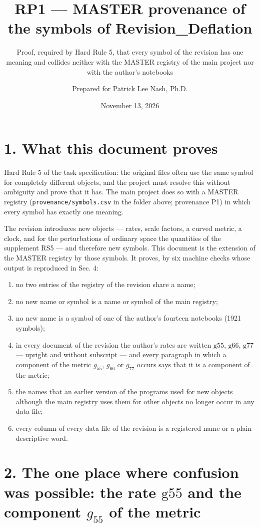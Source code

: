 \documentclass[
  10pt,
]{article}
\title{RP1 --- MASTER provenance of the symbols of Revision\_Deflation}
\subtitle{Proof, required by Hard Rule 5, that every symbol of the
revision has one meaning and collides neither with the MASTER registry
of the main project nor with the author's notebooks}
\author{Prepared for Patrick Lee Nash, Ph.D.}
\date{November 13, 2026}
\providecommand{\tightlist}{%
  \setlength{\itemsep}{0pt}\setlength{\parskip}{0pt}}
\begin{document}
\maketitle

\hypertarget{what-this-document-proves}{%
\section{1. What this document proves}\label{what-this-document-proves}}

Hard Rule 5 of the task specification: the original files often use the
same symbol for completely different objects, and the project must
resolve this without ambiguity and prove that it has. The main project
does so with a MASTER registry (\texttt{provenance/symbols.csv} in the
folder above; provenance P1) in which every symbol has exactly one
meaning.

The revision introduces new objects --- rates, scale factors, a curved
metric, a clock, and for the perturbations of ordinary space the
quantities of the supplement RS5 --- and therefore new symbols. This
document is the extension of the MASTER registry by those symbols. It
proves, by six machine checks whose output is reproduced in Sec. 4:

\begin{enumerate}
\def\labelenumi{\arabic{enumi}.}
\tightlist
\item
  no two entries of the registry of the revision share a name;
\item
  no new name or symbol is a name or symbol of the main registry;
\item
  no new name is a symbol of one of the author's fourteen notebooks
  (1921 symbols);
\item
  in every document of the revision the author's rates are written
  \(\mathrm{g55}\), \(\mathrm{g66}\), \(\mathrm{g77}\) --- upright and
  without subscript --- and every paragraph in which a component of the
  metric \(g_{55}\), \(g_{66}\) or \(g_{77}\) occurs says that it is a
  component of the metric;
\item
  the names that an earlier version of the programs used for new objects
  although the main registry uses them for other objects no longer occur
  in any data file;
\item
  every column of every data file of the revision is a registered name
  or a plain descriptive word.
\end{enumerate}

\hypertarget{the-one-place-where-confusion-was-possible-the-rate-mathrmg55-and-the-component-g_55-of-the-metric}{%
\section{\texorpdfstring{2. The one place where confusion was possible:
the rate \(\mathrm{g55}\) and the component \(g_{55}\) of the
metric}{2. The one place where confusion was possible: the rate \textbackslash mathrm\{g55\} and the component g\_\{55\} of the metric}}\label{the-one-place-where-confusion-was-possible-the-rate-mathrmg55-and-the-component-g_55-of-the-metric}}
\end{document}
